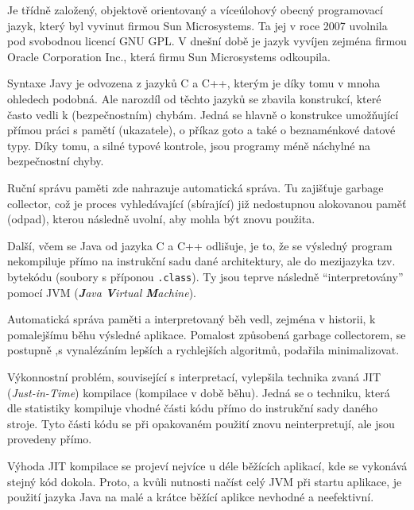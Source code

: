 Je třídně založený, objektově orientovaný a víceúlohový obecný programovací jazyk, který byl vyvinut firmou Sun Microsystems. Ta jej v roce 2007 uvolnila pod svobodnou licencí GNU GPL. V dnešní době je jazyk vyvíjen zejména firmou Oracle Corporation Inc., která firmu Sun Microsystems odkoupila.

Syntaxe Javy je odvozena z jazyků C a C++, kterým je díky tomu v mnoha ohledech podobná. Ale narozdíl od těchto jazyků se zbavila konstrukcí, které často vedli k (bezpečnostním) chybám. Jedná se hlavně o konstrukce umožňující přímou práci s pamětí (ukazatele), o příkaz goto a také o beznaménkové datové typy. Díky tomu, a silné typové kontrole, jsou programy méně náchylné na bezpečnostní chyby.

Ruční správu paměti zde nahrazuje automatická správa. Tu zajišťuje garbage collector, což je proces vyhledávající (sbírající) již nedostupnou alokovanou paměť (odpad), kterou následně uvolní, aby mohla být znovu použita.

Další, včem se Java od jazyka C a C++ odlišuje, je to, že se výsledný program nekompiluje přímo na instrukční sadu dané architektury, ale do mezijazyka tzv. bytekódu (soubory s příponou \texttt{.class}). Ty jsou teprve následně "`interpretovány"' pomocí JVM (\emph{\textbf{J}ava \textbf{V}irtual \textbf{M}achine}).

Automatická správa paměti a interpretovaný běh vedl, zejména v historii, k pomalejšímu běhu výsledné aplikace. Pomalost způsobená garbage collectorem, se postupně ,s vynalézáním lepších a rychlejších algoritmů, podařila minimalizovat.

Výkonnostní problém, související s interpretací, vylepšila technika zvaná JIT (\emph{Just-in-Time}) kompilace (kompilace v době běhu). Jedná se o techniku, která dle statistiky kompiluje vhodné části kódu přímo do instrukční sady daného stroje. Tyto části kódu se při opakovaném použití znovu neinterpretují, ale jsou provedeny přímo.

Výhoda JIT kompilace se projeví nejvíce u déle běžících aplikací, kde se vykonává stejný kód dokola. Proto, a kvůli nutnosti načíst celý JVM při startu aplikace, je použití jazyka Java na malé a krátce běžící aplikce nevhodné a neefektivní.


